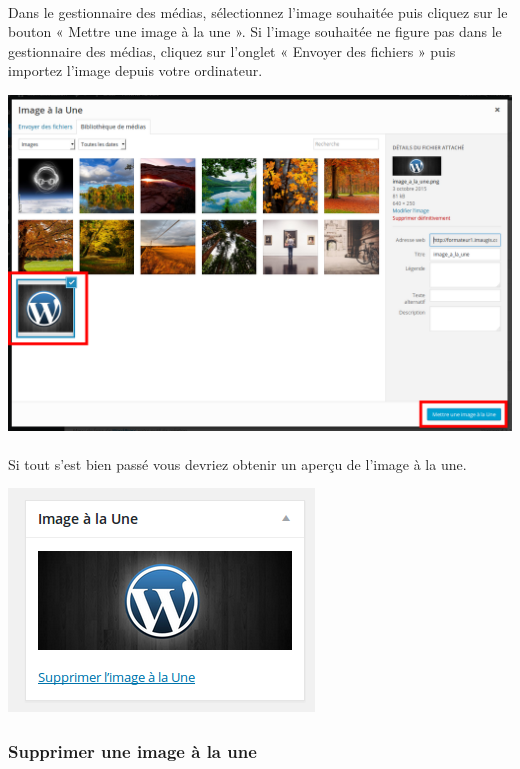 \documentclass[10pt,a4paper]{article}
\begin{document}
\paragraph{}Dans le gestionnaire des médias, sélectionnez l'image souhaitée puis cliquez sur le bouton « Mettre une image à la une ». Si l'image souhaitée ne figure pas dans le gestionnaire des médias, cliquez sur l'onglet « Envoyer des fichiers » puis importez l'image depuis votre ordinateur.
\begin{center}
\includegraphics[scale=0.25]{img/0099.png}
\end{center}
\paragraph{}Si tout s'est bien passé vous devriez obtenir un aperçu de l'image à la une.
\begin{center}
\includegraphics[scale=0.3]{img/0100.png}
\end{center}
\subsubsection{Supprimer une image à la une}
\end{document}
